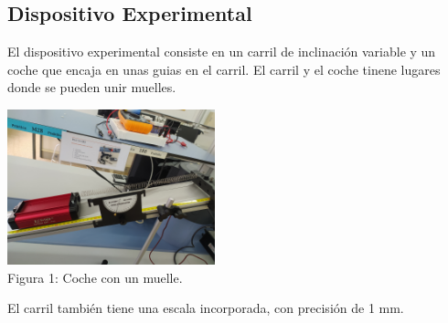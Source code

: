 \documentclass{article}
\begin{document}
\begin{multicols}{2}
\section*{Dispositivo Experimental}
El dispositivo experimental consiste en un carril de inclinación variable y un coche que encaja en unas guias en el carril. El carril y el coche tinene lugares donde se pueden unir muelles.
\begin{center}
    \includegraphics[width=0.45\textwidth]{figures/carril.png}\\
    Figura 1: Coche con un muelle.
\end{center}
El carril también tiene una escala incorporada, con precisión de 1 mm.


\end{multicols}
\end{document}

